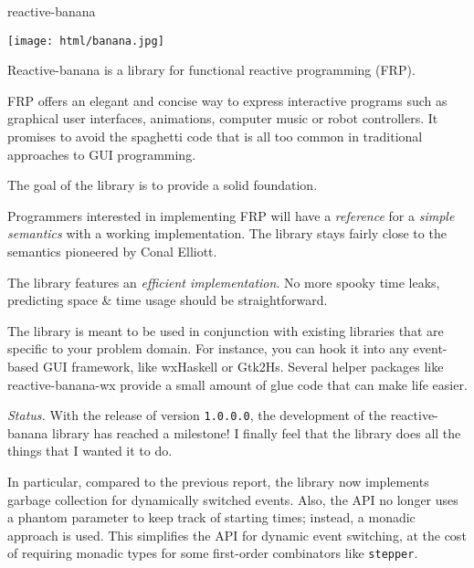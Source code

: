 \begin{hcarentry}[updated]{reactive-banana}
\makeheader

\begin{center}
\texttt{[image: html/banana.jpg]}
\end{center}

Reactive-banana is a library for functional reactive programming (FRP).

FRP offers an elegant and concise way to express interactive programs such as graphical user interfaces, animations, computer music or robot controllers. It promises to avoid the spaghetti code that is all too common in traditional approaches to GUI programming.

The goal of the library is to provide a solid foundation.
\begin{compactitem}
\item Programmers interested in implementing FRP will have a \emph{reference} for a \emph{simple semantics} with a working implementation. The library stays fairly close to the semantics pioneered by Conal Elliott.
\item The library features an \emph{efficient implementation}. No more spooky time leaks, predicting space \& time usage should be straightforward.
\end{compactitem}

The library is meant to be used in conjunction with existing libraries that are specific to your problem domain. For instance, you can hook it into any event-based GUI framework, like wxHaskell or Gtk2Hs. Several helper packages like reactive-banana-wx provide a small amount of glue code that can make life easier.

\emph{Status.} With the release of version \verb+1.0.0.0+, the development of the reactive-banana library has reached a milestone! I finally feel that the library does all the things that I wanted it to do.

In particular, compared to the previous report, the library now implements garbage collection for dynamically switched events. Also, the API no longer uses a phantom parameter to keep track of starting times; instead, a monadic approach is used. This simplifies the API for dynamic event switching, at the cost of requiring monadic types for some first-order combinators like \verb!stepper!.


\end{hcarentry}
